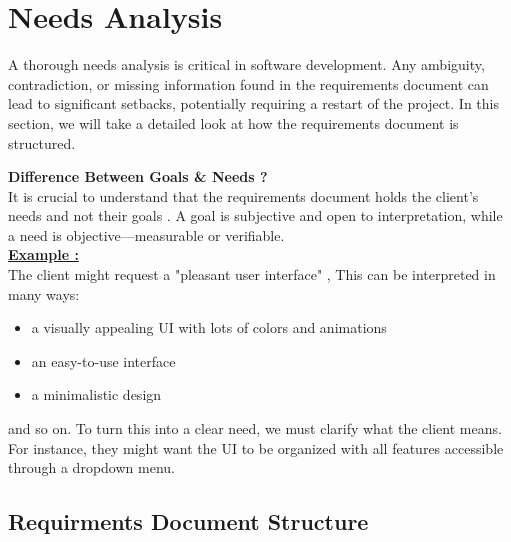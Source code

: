 \section{Needs Analysis}
A thorough needs analysis is critical in software development. Any ambiguity, contradiction, or missing information found in the
requirements document can lead to significant setbacks, potentially requiring a restart of the project. In this section, we will
take a detailed look at how the requirements document is structured.
\begin{tcolorbox}[title = Note] 
\textbf{Difference Between Goals \& Needs ?}\\

It is crucial to understand that the requirements document holds the client's needs and not their goals . A goal is subjective and
open to interpretation, while a need is objective—measurable or verifiable.\\

\textbf{\underline{Example :}}\\

The client might request a "pleasant user interface" , This can be interpreted in many ways:
\begin{itemize}
    \item a visually appealing UI with lots of colors and animations   
    \item an easy-to-use interface
    \item a minimalistic design
\end{itemize} 

and so on. To turn this into a clear need, we must clarify what the client means. For instance, they might want the UI to be 
organized with all features accessible through a dropdown menu.

\end{tcolorbox}\subsection{Requirments Document Structure}
